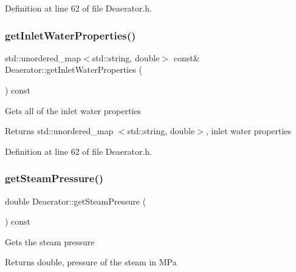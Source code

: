 Definition at line 62 of file Deaerator.\+h.

\mbox{\label{class_deaerator_a6dccf8495324c76a5d9b6128c57c0427}} 
\subsubsection{\texorpdfstring{get\+Inlet\+Water\+Properties()}{getInletWaterProperties()}\hspace{0.1cm}{\footnotesize\ttfamily [3/3]}}
{\footnotesize\ttfamily std\+::unordered\+\_\+map$<$std\+::string, double$>$ const\& Deaerator\+::get\+Inlet\+Water\+Properties (\begin{DoxyParamCaption}{ }\end{DoxyParamCaption}) const\hspace{0.3cm}{\ttfamily [inline]}}

Gets all of the inlet water properties \begin{DoxyReturn}{Returns}
std\+::unordered\+\_\+map $<$std\+::string, double$>$, inlet water properties 
\end{DoxyReturn}


Definition at line 62 of file Deaerator.\+h.

\mbox{\label{class_deaerator_aebe779c63cace193d040f497e3b70728}} 
\subsubsection{\texorpdfstring{get\+Steam\+Pressure()}{getSteamPressure()}\hspace{0.1cm}{\footnotesize\ttfamily [1/3]}}
{\footnotesize\ttfamily double Deaerator\+::get\+Steam\+Pressure (\begin{DoxyParamCaption}{ }\end{DoxyParamCaption}) const}

Gets the steam pressure \begin{DoxyReturn}{Returns}
double, pressure of the steam in M\+Pa 
\end{DoxyReturn}
\mbox{\label{class_deaerator_aebe779c63cace193d040f497e3b70728}} 
